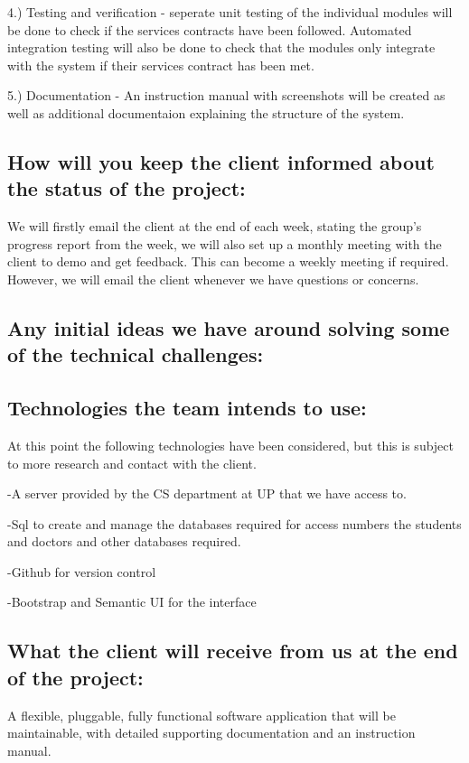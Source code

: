 \documentclass[hidelinks, 12pt, oneside]{article}
\begin{document}
4.) Testing and verification - seperate unit testing of the individual modules will be done to check if the services contracts have been followed. Automated integration testing will also be done to check that the modules only integrate with the system if their services contract has been met. 

5.) Documentation - An instruction manual with screenshots will be created as well as additional documentaion explaining the structure of the system.  

\subsection{How will you keep the client informed about the status of the project:}

We will firstly email the client at the end of each  week, stating the group's progress report from the week, we will also set up a monthly meeting with the client to demo and get feedback.  This can become a weekly meeting if required. However, we will email the client whenever we have questions or concerns.

\subsection{Any initial ideas we have around solving some of the technical challenges:}
  
\subsection{Technologies the team intends to use:} 

At this point the following technologies have been considered, but this is subject to more research and contact with the client. 

-A server provided by the CS department at UP that we have access to. 

-Sql to create and manage the databases required for access numbers the students and doctors and other databases required.

-Github for version control 
 
-Bootstrap and Semantic UI for the interface

\subsection{What the client will receive from us at the end of the project:}

A flexible, pluggable, fully functional software application  that will be maintainable, with detailed supporting documentation and an instruction manual.

 
\end{document}
